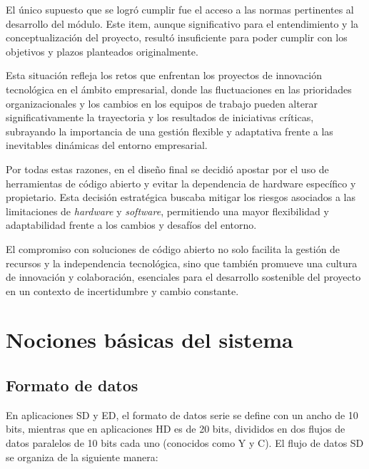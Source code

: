   El único supuesto que se logró cumplir fue el acceso a las normas pertinentes
  al desarrollo del módulo. Este item, aunque significativo para el entendimiento
  y la conceptualización del proyecto, resultó insuficiente para poder cumplir
  con los objetivos y plazos planteados originalmente.
  

  Esta situación refleja los retos que enfrentan los proyectos de innovación
  tecnológica en el ámbito empresarial, donde las fluctuaciones en las prioridades
  organizacionales y los cambios en los equipos de trabajo pueden alterar
  significativamente la trayectoria y los resultados de iniciativas críticas,
  subrayando la importancia de una gestión flexible y adaptativa frente a las
  inevitables dinámicas del entorno empresarial.

  Por todas estas razones, en el diseño final se decidió apostar por el uso de
  herramientas de código abierto y evitar la dependencia de hardware específico y
  propietario. Esta decisión estratégica buscaba mitigar los riesgos asociados a
  las limitaciones de \textit{hardware} y \textit{software}, permitiendo una
  mayor flexibilidad y adaptabilidad frente a los cambios y desafíos del entorno.

  El compromiso con soluciones de código abierto no solo facilita la gestión de
  recursos y la independencia tecnológica, sino que también promueve una cultura
  de innovación y colaboración, esenciales para el desarrollo sostenible del
  proyecto en un contexto de incertidumbre y cambio constante.

\section{Nociones básicas del sistema}

  \subsection{Formato de datos}

  En aplicaciones SD y ED, el formato de datos serie se define con un ancho de 10 bits,
  mientras que en aplicaciones HD es de 20 bits, divididos en dos flujos de datos paralelos
  de 10 bits cada uno (conocidos como Y y C). El flujo de datos SD se organiza de la
  siguiente manera:

